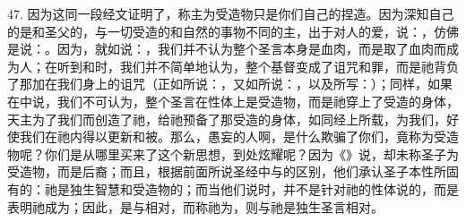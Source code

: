 47. 因为这同一段经文证明了，称主为受造物只是你们自己的捏造。因为深知自己的是和圣父的，与一切受造的和自然的事物不同的主，出于对人的爱，说：，仿佛是说：。因为，就如说：，我们并不认为整个圣言本身是血肉，而是取了血肉而成为人；在听到和时，我们并不简单地认为，整个基督变成了诅咒和罪，而是祂背负了那加在我们身上的诅咒（正如所说：，又如所说：，以及所写：）；同样，如果在中说，我们不可认为，整个圣言在性体上是受造物，而是祂穿上了受造的身体，天主为了我们而创造了祂，给祂预备了那受造的身体，如同经上所载，为我们，好使我们在祂内得以更新和被。那么，愚妄的人啊，是什么欺骗了你们，竟称为受造物呢？你们是从哪里买来了这个新思想，到处炫耀呢？因为《》说，却未称圣子为受造物，而是后裔；而且，根据前面所说圣经中与的区别，他们承认圣子本性所固有的：祂是独生智慧和受造物的；而当他们说时，并不是针对祂的性体说的，而是表明祂成为；因此，是与相对，而称祂为，则与祂是独生圣言相对。\par

